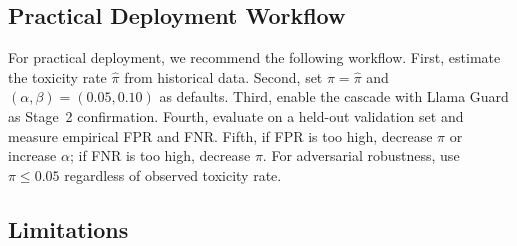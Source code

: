 \documentclass[acmtjournal, acmnowidth]{acmart}
\theoremstyle{definition}
\begin{document}
\subsection{Practical Deployment Workflow}

For practical deployment, we recommend the following workflow. First, estimate the toxicity rate $\hat{\pi}$ from historical data. Second, set $\pi = \hat{\pi}$ and $(\alpha, \beta) = (0.05, 0.10)$ as defaults. Third, enable the cascade with Llama Guard as Stage~2 confirmation. Fourth, evaluate on a held-out validation set and measure empirical FPR and FNR. Fifth, if FPR is too high, decrease $\pi$ or increase $\alpha$; if FNR is too high, decrease $\pi$. For adversarial robustness, use $\pi \leq 0.05$ regardless of observed toxicity rate.

\subsection{Limitations}
\end{document}
